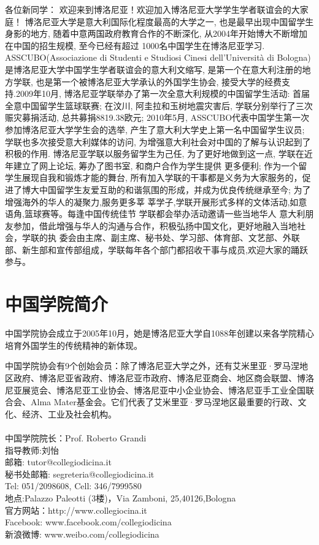 \documentclass[3pt,a5paper,openright,twoside]{book}
\begin{document}
各位新同学：
             欢迎来到博洛尼亚！欢迎加入博洛尼亚大学学生学者联谊会的大家庭！
          博洛尼亚大学是意大利国际化程度最高的大学之一, 也是最早出现中国留学生身影的地方, 随着中意两国政府教育合作的不断深化, 从2004年开始博大不断增加在中国的招生规模, 至今已经有超过 1000名中国学生在博洛尼亚学习.
          ASSCUBO(Associazione di Studenti e Studiosi Cinesi dell’Università di Bologna)是博洛尼亚大学中国学生学者联谊会的意大利文缩写, 是第一个在意大利注册的地方学联, 也是第一个被博洛尼亚大学承认的外国学生协会, 接受大学的经费支持.2009年10月, 博洛尼亚学联举办了第一次全意大利规模的中国留学生活动: 首届全意中国留学生篮球联赛; 在汶川, 阿圭拉和玉树地震灾害后, 学联分别举行了三次赈灾募捐活动, 总共募捐8819.38欧元;  2010年5月, ASSCUBO代表中国学生第一次参加博洛尼亚大学学生会的选举, 产生了意大利大学史上第一名中国留学生议员; 学联也多次接受意大利媒体的访问, 为增强意大利社会对中国的了解与认识起到了积极的作用.
          博洛尼亚学联以服务留学生为己任, 为了更好地做到这一点, 学联在近年建立了网上论坛, 筹办了图书室, 和商户合作为学生提供 更多便利; 作为一个留学生展现自我和锻炼才能的舞台, 所有加入学联的干事都是义务为大家服务的，促进了博大中国留学生友爱互助的和谐氛围的形成，并成为优良传统继承至今; 为了增强海外的华人的凝聚力,服务更多莘 莘学子,学联开展形式多样的文体活动,如意语角,篮球赛等。每逢中国传统佳节 学联都会举办活动邀请一些当地华人 意大利朋友参加，借此增强与华人的沟通与合作，积极弘扬中国文化，更好地融入当地社会，学联的执 委会由主席、副主席、秘书处、学习部、体育部、文艺部、外联部、新生部和宣传部组成，学联每年各个部门都招收干事与成员,欢迎大家的踊跃参与。 



\section{中国学院简介}


         中国学院协会成立于2005年10月，她是博洛尼亚大学自1088年创建以来各学院精心培育外国学生的传统精神的新体现。

          中国学院协会有9个创始会员：除了博洛尼亚大学之外，还有艾米里亚·罗马涅地区政府、博洛尼亚省政府、博洛尼亚市政府、博洛尼亚商会、地区商会联盟、博洛尼亚展览会、博洛尼亚工业协会、博洛尼亚中小企业协会、博洛尼亚手工业全国联合会、Alma Mater基金会。它们代表了艾米里亚·罗马涅地区最重要的行政、文化、经济、工业及社会机构。\\\\
          \noindent 中国学院院长：Prof. Roberto Grandi\\
          指导教师:刘怡\\
		  邮箱: tutor@collegiodicina.it\\
		  秘书处邮箱: segreteria@collegiodicina.it\\
		   Tel: 051/2098608, Cell: 346/7999580 \\
			地点:Palazzo Paleotti (3楼)，Via Zamboni, 25,40126,Bologna\\
官方网站：http://www.collegiocina.it\\
Facebook: www.facebook.com/collegiodicina\\
新浪微博: www.weibo.com/collegiodicina
\end{document}
